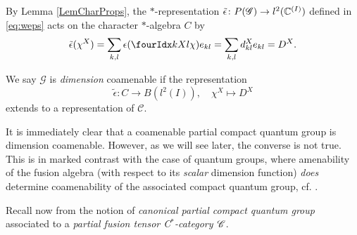 By Lemma \ref{LemCharProps}, the $*$-representation $\operatorname{\tilde{\epsilon}} \colon P(\mathscr{G})
\to l^{2}(\mathbb{C}^{(I)})$ defined in
\eqref{eq:weps}  acts on the character $*$-algebra $C$ by
\begin{align*}
  \weps(\chi^{X}) = \sum_{k,l} \epsilon(\Gr{\chi}{}{X}{k}{l})e_{kl} =
  \sum_{k,l} d^{X}_{kl} e_{kl} =D^{X}.
\end{align*}



\begin{Def} We say $\mathscr{G}$ is \emph{dimension} coamenable %
if the representation \[\tilde{\epsilon}: C \rightarrow B(l^2(I)), \quad \chi^X \mapsto D^X\] extends to a representation of $\mathcal{C}$.
\end{Def}

It is immediately clear that a coamenable partial compact quantum group is dimension coamenable. However, as we will see later, the converse is not true. This is in marked contrast with the case of quantum groups, where amenability of the fusion algebra (with respect to its \emph{scalar} dimension function) \emph{does} determine coamenability of the associated compact quantum group, cf. \cite[Theorem 4.5]{Kye1}.
 

Recall now from \cite[Definition 1.23 and Section 4.1]{DCT1} the notion of \emph{canonical partial compact quantum group} associated to a \emph{partial fusion tensor C$^*$-category $\mathscr{C}$}.

